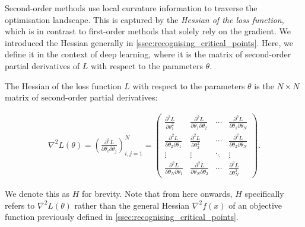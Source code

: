\label{ssec:second_order_methods}



Second-order methods use local curvature information to traverse the optimisation landscape. This is captured by the \textit{Hessian of the loss function}, which is in contrast to first-order methods that solely rely on the gradient. We introduced the Hessian generally in \cref{ssec:recognising_critical_points}. Here, we define it in the context of deep learning, where it is the matrix of second-order partial derivatives of $L$ with respect to the parameters $\theta$.

\begin{definition}

    The Hessian of the loss function $L$ with respect to the parameters $\theta$ is the $N \times N$ matrix of second-order partial derivatives:

    \begin{align}

        \nabla^2 L(\theta) = \left(\frac{\partial^2 L}{\partial \theta_i \partial \theta_j}\right)_{i,j=1}^N = 

        \begin{pmatrix}

            \frac{\partial^2 L}{\partial \theta_1^2} & \frac{\partial^2 L}{\partial \theta_1 \partial \theta_2} & \cdots & \frac{\partial^2 L}{\partial \theta_1 \partial \theta_N} \\

            \frac{\partial^2 L}{\partial \theta_2 \partial \theta_1} & \frac{\partial^2 L}{\partial \theta_2^2} & \cdots & \frac{\partial^2 L}{\partial \theta_2 \partial \theta_N} \\

            \vdots & \vdots & \ddots & \vdots \\

            \frac{\partial^2 L}{\partial \theta_N \partial \theta_1} & \frac{\partial^2 L}{\partial \theta_N \partial \theta_2} & \cdots & \frac{\partial^2 L}{\partial \theta_N^2}

        \end{pmatrix}.

    \end{align}

\end{definition}

We denote this as $H$ for brevity. Note that from here onwards, $H$ specifically refers to $\nabla^2 L(\theta)$ rather than the general Hessian $\nabla^2 f(x)$ of an objective function previously defined in \cref{ssec:recognising_critical_points}.



